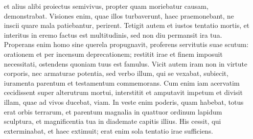 \begin{biblechapter}
\begin{biblechapter}
\begin{biblechapter}
\begin{biblechapter}
\begin{biblechapter}
\begin{biblechapter}
\begin{biblechapter}
\begin{biblechapter}
\begin{biblechapter}
\begin{biblechapter}
\begin{biblechapter}
\begin{biblechapter}
\begin{biblechapter}
\begin{biblechapter}
\begin{biblechapter}
\begin{biblechapter}
\begin{biblechapter}
\begin{biblechapter}
 \verse et alius alibi proiectus semivivus,
 propter quam moriebatur causam, demonstrabat.
 \verse Visiones enim, quae illos turbaverunt, haec praemonebant,
 ne inscii quare mala patiebantur, perirent.
 \verse Tetigit autem et iustos tentatio mortis,
 et interitus in eremo factus est multitudinis,
 sed non diu permansit ira tua.
 \verse Properans enim homo sine querela propugnavit,
 proferens servitutis suae scutum:
 orationem et per incensum deprecationem;
 restitit irae et finem imposuit necessitati,
 ostendens quoniam tuus est famulus.
 \verse Vicit autem iram non in virtute corporis,
 nec armaturae potentia,
 sed verbo illum, qui se vexabat, subiecit,
 iuramenta parentum et testamentum commemorans.
 \verse Cum enim iam acervatim cecidissent super alterutrum mortui,
 interstitit et amputavit impetum
 et divisit illam, quae ad vivos ducebat, viam.
 \verse In veste enim poderis, quam habebat, totus erat orbis terrarum,
 et parentum magnalia in quattuor ordinum lapidum sculptura, et magnificentia tua in diademate capitis illius.
 \verse His cessit, qui exterminabat, et haec extimuit;
 erat enim sola tentatio irae sufficiens.
 

\end{biblechapter}
\end{biblechapter}
\end{biblechapter}
\end{biblechapter}
\end{biblechapter}
\end{biblechapter}
\end{biblechapter}
\end{biblechapter}
\end{biblechapter}
\end{biblechapter}
\end{biblechapter}
\end{biblechapter}
\end{biblechapter}
\end{biblechapter}
\end{biblechapter}
\end{biblechapter}
\end{biblechapter}
\end{biblechapter}
